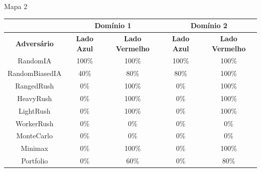 \documentclass{beamer}
\begin{document}
\begin{frame}{Mapa 2}
	
	{\footnotesize
			\begin{tabular}{|c|cc|cc|}
				\hline
				\textbf{}           & \multicolumn{2}{c|}{\textbf{Domínio 1}}  & \multicolumn{2}{c|}{\textbf{Domínio 2}}  \\ \hline
				\textbf{Adversário} & \textbf{Lado Azul} & \textbf{Lado Vermelho} & \textbf{Lado Azul} & \textbf{Lado Vermelho} \\ \hline
				RandomIA            & 100\%              & 100\%                  & 100\%              & 100\%                  \\ \hline
				RandomBiasedIA      & 40\%               & 80\%                   & 80\%               & 100\%                  \\ \hline
				RangedRush          & 0\%                & 100\%                  & 0\%                & 100\%                  \\ \hline
				HeavyRush           & 0\%                & 100\%                  & 0\%                & 100\%                  \\ \hline
				LightRush           & 0\%                & 100\%                  & 0\%                & 100\%                  \\ \hline
				WorkerRush          & 0\%                & 0\%                    & 0\%                & 0\%                    \\ \hline
				MonteCarlo          & 0\%                & 0\%                    & 0\%                & 0\%                    \\ \hline
				Minimax             & 0\%                & 100\%                  & 0\%                & 100\%                  \\ \hline
				Portfolio           & 0\%                & 60\%                  & 0\%                & 80\%                  \\ \hline
			\end{tabular}
	}
\end{frame}
\end{document}
